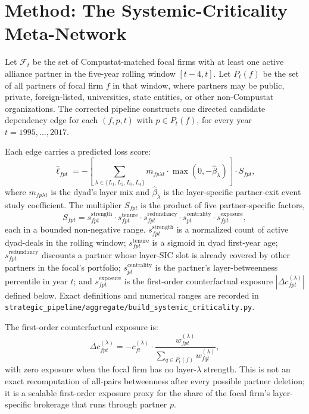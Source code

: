 \documentclass[11pt,letterpaper]{article}
\begin{document}
\section{Method: The Systemic-Criticality Meta-Network}
\label{sec:method}

Let $\mathcal{F}_{t}$ be the set of Compustat-matched focal firms with
at least one active alliance partner in the five-year rolling window
$[t-4,t]$.  Let $P_t(f)$ be the set of all partners of focal firm $f$
in that window, where partners may be public, private, foreign-listed,
universities, state entities, or other non-Compustat organizations.
The corrected pipeline constructs one directed candidate dependency
edge for each $(f,p,t)$ with $p \in P_t(f)$, for every year
$t=1995,\ldots,2017$.

Each edge carries a predicted loss score:
\begin{equation}
  \widehat{\ell}_{fpt}
  = - \left[
      \sum_{\lambda \in \{L_1,L_2,L_3,L_4\}}
      m_{fp\lambda t} \cdot
      \max(0,-\widehat{\beta}_{\lambda})
    \right]
    \cdot
    S_{fpt},
\end{equation}
where $m_{fp\lambda t}$ is the dyad's layer mix and
$\widehat{\beta}_{\lambda}$ is the layer-specific partner-exit event
study coefficient.  The multiplier $S_{fpt}$ is the product of five
partner-specific factors,
\begin{equation}
  S_{fpt} = s^{\text{strength}}_{fpt} \cdot
            s^{\text{tenure}}_{fpt}   \cdot
            s^{\text{redundancy}}_{fpt} \cdot
            s^{\text{centrality}}_{pt} \cdot
            s^{\text{exposure}}_{fpt},
\end{equation}
each in a bounded non-negative range.  $s^{\text{strength}}_{fpt}$
is a normalized count of active dyad-deals in the rolling window;
$s^{\text{tenure}}_{fpt}$ is a sigmoid in dyad first-year age;
$s^{\text{redundancy}}_{fpt}$ discounts a partner whose layer-SIC
slot is already covered by other partners in the focal's
portfolio; $s^{\text{centrality}}_{pt}$ is the partner's
layer-betweenness percentile in year $t$; and
$s^{\text{exposure}}_{fpt}$ is the first-order counterfactual
exposure $|\Delta c^{(\lambda)}_{fpt}|$ defined below.  Exact
definitions and numerical ranges are recorded in
\texttt{strategic\_pipeline/aggregate/build\_systemic\_criticality.py}.

The first-order counterfactual exposure is:
\begin{equation}
  \Delta c^{(\lambda)}_{fpt}
  =
  - c^{(\lambda)}_{ft}
  \cdot
  \frac{w^{(\lambda)}_{fpt}}
       {\sum_{q \in P_t(f)} w^{(\lambda)}_{fqt}},
\end{equation}
with zero exposure when the focal firm has no layer-$\lambda$ strength.
This is not an exact recomputation of all-pairs betweenness after every
possible partner deletion; it is a scalable first-order exposure proxy
for the share of the focal firm's layer-specific brokerage that runs
through partner $p$.
\end{document}

